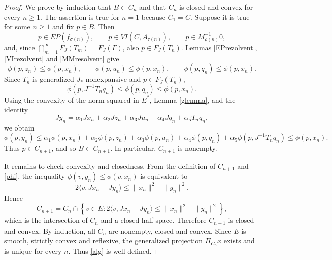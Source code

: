 \documentclass[10pt,a4paper]{amsart}
\numberwithin{equation}{section}
\begin{document}
\begin{proof}
We prove by induction that $B\subset C_n$ and that $C_n$ is closed and convex for every $n\geq1$. The assertion is true for $n=1$ because $C_1=C$. Suppose it is true for some $n\geq1$ and fix $p\in B$. Then
\[
p\in EP(f_{\sigma(n)}),\qquad p\in VI(C,A_{\tau(n)}),\qquad
p\in M_{\rho(n)}^{-1}0,
\]
and, since $\bigcap_{m=1}^{\infty}F_J(T_m)=F_J(\Gamma)$, also $p\in F_J(T_n)$. Lemmas \ref{EPrezolvent}, \ref{VIrezolvent} and \ref{MMresolvent} give
\[
\phi(p,z_n)\leq\phi(p,x_n),\qquad
\phi(p,u_n)\leq\phi(p,x_n),\qquad
\phi(p,q_n)\leq\phi(p,x_n).
\]
Since $T_n$ is generalized $J_{*}$-nonexpansive and $p\in F_J(T_n)$,
\[
\phi(p,J^{-1}T_nq_n)\leq \phi(p,q_n)\leq \phi(p,x_n).
\]
Using the convexity of the norm squared in $E^{*}$, Lemma \ref{glemma}, and the identity
\[
Jy_n=\alpha_1Jx_n+\alpha_2Jz_n+\alpha_3Ju_n+\alpha_4Jq_n+\alpha_5T_nq_n,
\]
we obtain
\[
\phi(p,y_n)\leq
\alpha_1\phi(p,x_n)+\alpha_2\phi(p,z_n)+\alpha_3\phi(p,u_n)
+\alpha_4\phi(p,q_n)+\alpha_5\phi(p,J^{-1}T_nq_n)
\leq \phi(p,x_n).
\]
Thus $p\in C_{n+1}$, and so $B\subset C_{n+1}$. In particular, $C_{n+1}$ is nonempty.

It remains to check convexity and closedness. From the definition of $C_{n+1}$ and \eqref{phi}, the inequality $\phi(v,y_n)\leq\phi(v,x_n)$ is equivalent to
\[
2\langle v,Jx_n-Jy_n\rangle\leq \|x_n\|^2-\|y_n\|^2.
\]
Hence
\[
C_{n+1}=C_n\cap
\left\{v\in E:2\langle v,Jx_n-Jy_n\rangle\leq\|x_n\|^2-\|y_n\|^2\right\},
\]
which is the intersection of $C_n$ and a closed half-space. Therefore $C_{n+1}$ is closed and convex. By induction, all $C_n$ are nonempty, closed and convex. Since $E$ is smooth, strictly convex and reflexive, the generalized projection $\Pi_{C_n}x$ exists and is unique for every $n$. Thus \eqref{alg} is well defined.
\end{proof}
\end{document}
